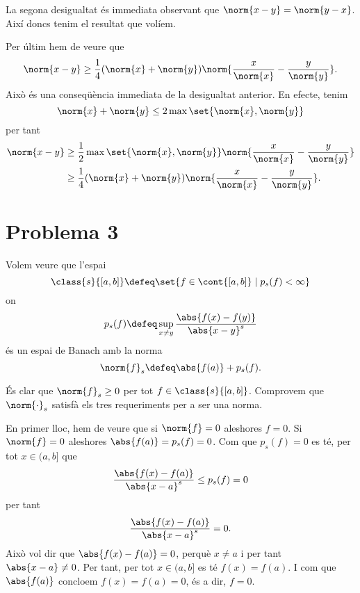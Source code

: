 \documentclass[12pt]{article}
\begin{document}
La segona desigualtat és immediata observant que \( \norm{x - y} = \norm{y - x} \). Així
doncs tenim el resultat que volíem.

\parbreak

Per últim hem de veure que
\begin{equation*}
	\norm{x - y} \geq \frac{1}{4} (\norm{x} + \norm{y}) \norm{\frac{x}{\norm{x}} -
	\frac{y}{\norm{y}}}.
\end{equation*}
Això és una conseqüència immediata de la desigualtat anterior. En efecte, tenim
\begin{equation*}
	\norm{x} + \norm{y} \leq 2 \max\set{\norm{x}, \norm{y}}
\end{equation*}
per tant
\begin{align*}
	\norm{x - y} & \geq \frac{1}{2} \max\set{\norm{x}, \norm{y}} \norm{\frac{x}{\norm{x}} -
	\frac{y}{\norm{y}}} \\
							 & \geq \frac{1}{4} (\norm{x} + \norm{y}) \norm{\frac{x}{\norm{x}} -
	\frac{y}{\norm{y}}}.
\end{align*}

\section*{Problema 3}
Volem veure que l'espai
\begin{equation*}
	\class{s}{[a,b]} \defeq \set{f \in \cont{[a,b]} \mid p_s(f) < \infty}
\end{equation*}
on
\begin{equation*}
	p_s(f) \defeq \sup_{x \neq y} \frac{\abs{f(x) - f(y)}}{\abs{x - y}^s}
\end{equation*}
és un espai de Banach amb la norma
\begin{equation*}
	\norm{f}_s \defeq \abs{f(a)} + p_s(f).
\end{equation*}

És clar que \( \norm{f}_s \geq 0 \) per tot \( f \in \class{s}{[a,b]} \). Comprovem que \(
\norm{\cdot}_s \) satisfà els tres requeriments per a ser una norma.

En primer lloc, hem de veure que si \( \norm{f} = 0 \) aleshores \( f = 0 \). Si \(
\norm{f} = 0 \) aleshores \( \abs{f(a)} = p_s(f) = 0 \). Com que \( p_s(f) = 0 \) es té,
per tot \( x \in (a,b] \) que
\begin{equation*}
	\frac{\abs{f(x) - f(a)}}{\abs{x - a}^s} \leq p_s(f) = 0
\end{equation*}
per tant
\begin{equation*}
	\frac{\abs{f(x) - f(a)}}{\abs{x - a}^s} = 0.
\end{equation*}
Això vol dir que \( \abs{f(x) - f(a)} = 0 \), perquè \( x \neq a \) i per tant \( \abs{x -
a} \neq 0 \). Per tant, per tot \( x \in (a,b] \) es té \( f(x) = f(a) \). I com que \(
\abs{f(a)} \) concloem \( f(x) = f(a) = 0 \), és a dir, \( f = 0 \).
\end{document}
